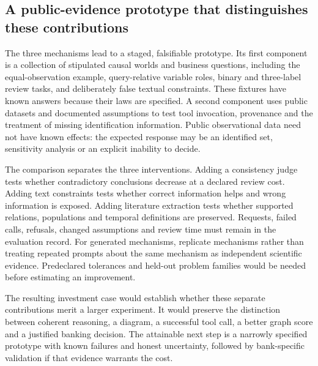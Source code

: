\subsection{A public-evidence prototype that distinguishes these contributions}

The three mechanisms lead to a staged, falsifiable prototype. Its first
component is a collection of stipulated causal worlds and business questions,
including the equal-observation example, query-relative variable roles,
binary and three-label review tasks, and deliberately false textual
constraints. These fixtures have known answers because their laws are
specified. A second component uses public datasets and documented assumptions
to test tool invocation, provenance and the treatment of missing identification
information. Public observational data need not have known effects: the
expected response may be an identified set, sensitivity analysis or an
explicit inability to decide.

The comparison separates the three interventions. Adding a consistency judge
tests whether contradictory conclusions decrease at a declared review cost.
Adding text constraints tests whether correct information helps and wrong
information is exposed. Adding literature extraction tests whether supported
relations, populations and temporal definitions are preserved. Requests,
failed calls, refusals, changed assumptions and review time must remain in
the evaluation record. For generated mechanisms, replicate mechanisms rather
than treating repeated prompts about the same mechanism as independent
scientific evidence. Predeclared tolerances and held-out problem families
would be needed before estimating an improvement.

The resulting investment case would establish whether these separate
contributions merit a larger experiment. It would preserve the distinction
between coherent reasoning, a diagram, a successful tool call, a better
graph score and a justified banking decision. The attainable next step is
a narrowly specified prototype with known failures and honest uncertainty,
followed by bank-specific validation if that evidence warrants the cost.
\label{exec17:frontier-end}
